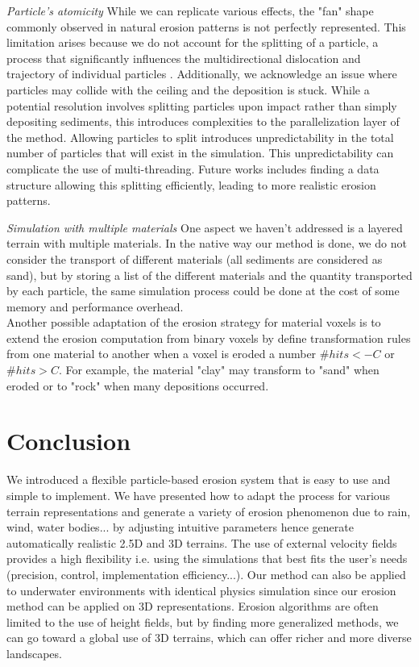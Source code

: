 \textit{Particle's atomicity}
While we can replicate various effects, the "fan" shape commonly observed in natural erosion patterns is not perfectly represented. This limitation arises because we do not account for the splitting of a particle, a process that significantly influences the multidirectional dislocation and trajectory of individual particles \cite{Ranz1960}. Additionally, we acknowledge an issue where particles may collide with the ceiling and the deposition is stuck. While a potential resolution involves splitting particles upon impact rather than simply depositing sediments, this introduces complexities to the parallelization layer of the method. Allowing particles to split introduces unpredictability in the total number of particles that will exist in the simulation. This unpredictability can complicate the use of multi-threading. Future works includes finding a data structure allowing this splitting efficiently, leading to more realistic erosion patterns.

\textit{Simulation with multiple materials}
One aspect we haven't addressed is a layered terrain with multiple materials. In the native way our method is done, we do not consider the transport of different materials (all sediments are considered as sand), but by storing a list of the different materials and the quantity transported by each particle, the same simulation process could be done at the cost of some memory and performance overhead. \\
Another possible adaptation of the erosion strategy for material voxels is to extend the erosion computation from binary voxels by define transformation rules from one material to another when a voxel is eroded a number $\#hits < -C$ or $\#hits > C$. For example, the material "clay" may transform to "sand" when eroded or to "rock" when many depositions occurred. 
\section{Conclusion}
\label{sec:erosion_conclusion}
We introduced a flexible particle-based erosion system that is easy to use and simple to implement. We have presented how to adapt the process for various terrain representations and generate a variety of erosion phenomenon due to rain, wind, water bodies... by adjusting intuitive parameters hence generate automatically realistic 2.5D and 3D terrains. The use of external velocity fields provides a high flexibility i.e. using the simulations that best fits the user's needs (precision, control, implementation efficiency...). 
Our method can also be applied to underwater environments with identical physics simulation since our erosion method can be applied on 3D representations. 
Erosion algorithms are often limited to the use of height fields, but by finding more generalized methods, we can go toward a global use of 3D terrains, which can offer richer and more diverse landscapes.

